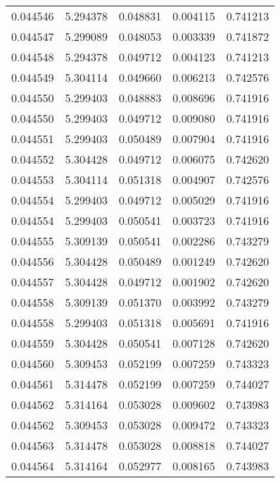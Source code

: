 \begin{tabular}{lrrrr}
0.044546    &  5.294378 &  0.048831 &  0.004115 &             0.741213 \\
0.044547    &  5.299089 &  0.048053 &  0.003339 &             0.741872 \\
0.044548    &  5.294378 &  0.049712 &  0.004123 &             0.741213 \\
0.044549    &  5.304114 &  0.049660 &  0.006213 &             0.742576 \\
0.044550    &  5.299403 &  0.048883 &  0.008696 &             0.741916 \\
0.044550    &  5.299403 &  0.049712 &  0.009080 &             0.741916 \\
0.044551    &  5.299403 &  0.050489 &  0.007904 &             0.741916 \\
0.044552    &  5.304428 &  0.049712 &  0.006075 &             0.742620 \\
0.044553    &  5.304114 &  0.051318 &  0.004907 &             0.742576 \\
0.044554    &  5.299403 &  0.049712 &  0.005029 &             0.741916 \\
0.044554    &  5.299403 &  0.050541 &  0.003723 &             0.741916 \\
0.044555    &  5.309139 &  0.050541 &  0.002286 &             0.743279 \\
0.044556    &  5.304428 &  0.050489 &  0.001249 &             0.742620 \\
0.044557    &  5.304428 &  0.049712 &  0.001902 &             0.742620 \\
0.044558    &  5.309139 &  0.051370 &  0.003992 &             0.743279 \\
0.044558    &  5.299403 &  0.051318 &  0.005691 &             0.741916 \\
0.044559    &  5.304428 &  0.050541 &  0.007128 &             0.742620 \\
0.044560    &  5.309453 &  0.052199 &  0.007259 &             0.743323 \\
0.044561    &  5.314478 &  0.052199 &  0.007259 &             0.744027 \\
0.044562    &  5.314164 &  0.053028 &  0.009602 &             0.743983 \\
0.044562    &  5.309453 &  0.053028 &  0.009472 &             0.743323 \\
0.044563    &  5.314478 &  0.053028 &  0.008818 &             0.744027 \\
0.044564    &  5.314164 &  0.052977 &  0.008165 &             0.743983 \\

\end{tabular}
